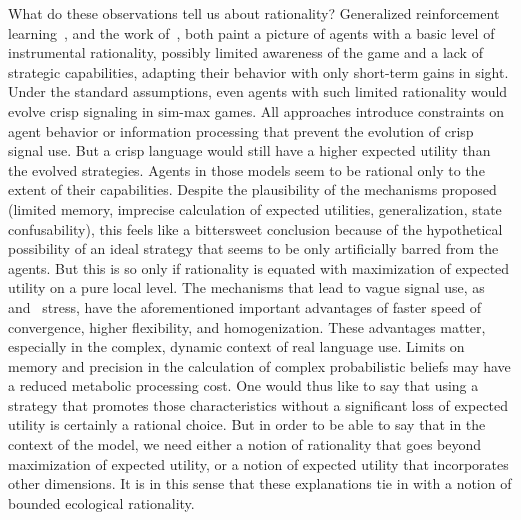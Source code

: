 \documentclass[a4paper]{article}
\begin{document}
What do these observations tell us about rationality?
Generalized reinforcement learning~\parencite{oconnor_evolution_2014}, and the work of~\textcite{franke_vagueness_2017}, both paint a picture of agents with a basic level of instrumental rationality, possibly limited awareness of the game and a lack of strategic capabilities, adapting their behavior with only short-term gains in sight.
Under the standard assumptions, even agents with such limited rationality would evolve crisp signaling in sim-max games.
All approaches introduce constraints on agent behavior or information processing that prevent the evolution of crisp signal use.
But a crisp language would still have a higher expected utility than the evolved strategies.
Agents in those models seem to be rational only to the extent of their capabilities.
Despite the plausibility of the mechanisms proposed (limited memory, imprecise calculation of expected utilities, generalization, state confusability), this feels like a bittersweet conclusion because of the hypothetical possibility of an ideal strategy that seems to be only artificially barred from the agents.
But this is so only if rationality is equated with maximization of expected utility on a pure local level.
The mechanisms that lead to vague signal use, as~\textcite{oconnor_evolution_2014} and~\textcite{franke_vagueness_2017} stress, have the aforementioned important advantages of faster speed of convergence, higher flexibility, and homogenization.
These advantages matter, especially in the complex, dynamic context of real language use.
Limits on memory and precision in the calculation of complex probabilistic beliefs may have a reduced metabolic processing cost.
One would thus like to say that using a strategy that promotes those characteristics without a significant loss of expected utility is certainly a rational choice.
But in order to be able to say that in the context of the model, we need either a notion of rationality that goes beyond maximization of expected utility, or a notion of expected utility that incorporates other dimensions.
It is in this sense that these explanations tie in with a notion of bounded ecological rationality.
\end{document}
